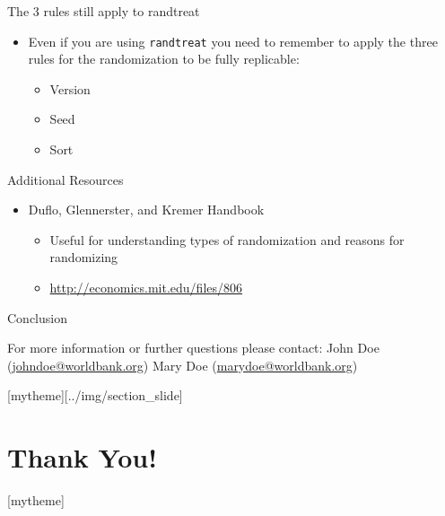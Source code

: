\documentclass[aspectratio=169]{beamer}
\newcommand{\sectionpic}[2]{
	\setbeamertemplate{section page}[mytheme][#2]
	\section{#1}
	\setbeamertemplate{section page}[mytheme]
}
\begin{document}
\begin{frame}{The 3 rules still apply to randtreat}
	\begin{itemize}
		\item Even if you are using \texttt{randtreat} you need to remember to apply the three rules for the randomization to be fully replicable:
		\begin{itemize}
			\item Version
			\item Seed
			\item Sort
		\end{itemize}
	\end{itemize}
\end{frame}


\begin{frame}{Additional Resources}
	\begin{itemize}
		\item Duflo, Glennerster, and Kremer Handbook
		\begin{itemize}
			\item Useful for understanding types of randomization and reasons for randomizing
			\item \url{http://economics.mit.edu/files/806}
		\end{itemize}
	\end{itemize}
\end{frame}


\begin{frame}{Conclusion}


\vspace{20mm}
For more information or further questions please contact:
\newline John Doe (\url{johndoe@worldbank.org}) \newline Mary Doe (\url{marydoe@worldbank.org})

\end{frame}

\sectionpic{Thank You!}{../img/section_slide}
\end{document}
